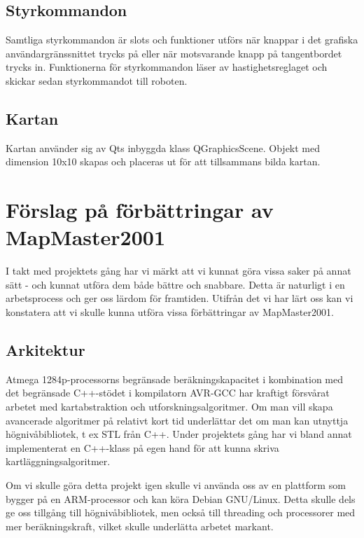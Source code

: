 \documentclass[a4paper,12pt,fleqn]{article}
\begin{document}
\subsection{Styrkommandon}
Samtliga styrkommandon är slots och funktioner utförs när knappar i det grafiska användargränssnittet trycks på eller när motsvarande knapp på tangentbordet trycks in. 
Funktionerna för styrkommandon läser av hastighetsreglaget och skickar sedan styrkommandot till roboten. 
\subsection{Kartan}
Kartan använder sig av Qts inbyggda klass QGraphicsScene. Objekt med dimension 10x10 skapas och placeras ut för att tillsammans bilda kartan.


\newpage
\section{Förslag på förbättringar av MapMaster2001}

I takt med projektets gång har vi märkt att vi kunnat göra vissa saker på annat sätt - och kunnat utföra dem både bättre och snabbare. Detta är naturligt i en arbetsprocess och ger oss lärdom för framtiden. Utifrån det vi har lärt oss kan vi konstatera att vi skulle kunna utföra vissa förbättringar av MapMaster2001. 

\subsection{Arkitektur \label{head:arch}}

Atmega 1284p-processorns begränsade beräkningskapacitet i kombination med det begränsade C++-stödet i kompilatorn AVR-GCC har kraftigt försvårat arbetet med kartabstraktion och utforskningsalgoritmer. Om man vill skapa avancerade algoritmer på relativt kort tid underlättar det om man kan utnyttja högnivåbibliotek, t ex STL från C++. Under projektets gång har vi bland annat implementerat en C++-klass på egen hand för att kunna skriva kartläggningsalgoritmer. 

Om vi skulle göra detta projekt igen skulle vi använda oss av en plattform som bygger på en ARM-processor och kan köra Debian GNU/Linux. Detta skulle dels ge oss tillgång till högnivåbibliotek, men också till threading och processorer med mer beräkningskraft, vilket skulle underlätta arbetet markant. 
\end{document}

